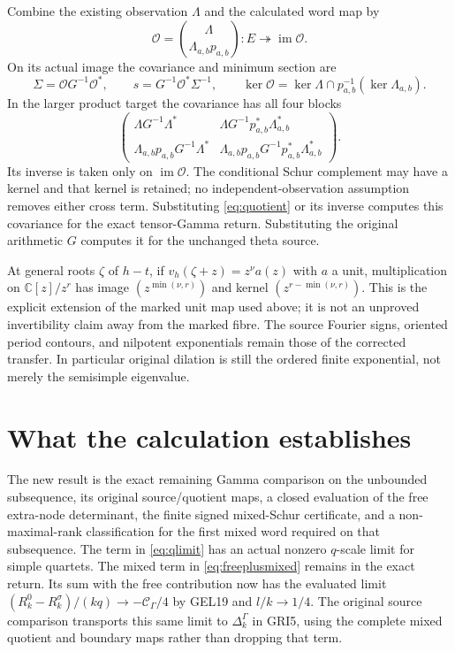\documentclass[11pt,a4paper]{article}
\newcommand{\C}{\mathbb C}
\newcommand{\im}{\operatorname{im}}
\begin{document}
Combine the existing observation $\Lambda$ and the calculated word map by
\begin{equation}
 \mathcal O=\binom{\Lambda}{\Lambda_{a,b}p_{a,b}}:
 E\twoheadrightarrow\im\mathcal O.
\end{equation}
On its actual image the covariance and minimum section are
\begin{equation}
 \Sigma=\mathcal O G^{-1}\mathcal O^*,\qquad
 s=G^{-1}\mathcal O^*\Sigma^{-1},\qquad
 \ker\mathcal O=\ker\Lambda\cap p_{a,b}^{-1}(\ker\Lambda_{a,b}).
\end{equation}
In the larger product target the covariance has all four blocks
\begin{equation}
 \begin{pmatrix}
 \Lambda G^{-1}\Lambda^*&\Lambda G^{-1}p_{a,b}^*\Lambda_{a,b}^*\\
 \Lambda_{a,b}p_{a,b}G^{-1}\Lambda^*&
 \Lambda_{a,b}p_{a,b}G^{-1}p_{a,b}^*\Lambda_{a,b}^*
 \end{pmatrix}.
\end{equation}
Its inverse is taken only on $\im\mathcal O$. The conditional Schur complement may have a kernel and that kernel is retained; no independent-observation assumption removes either cross term. Substituting \eqref{eq:quotient} or its inverse computes this covariance for the exact tensor-Gamma return. Substituting the original arithmetic $G$ computes it for the unchanged theta source.

At general roots $\zeta$ of $h-t$, if $v_h(\zeta+z)=z^\nu a(z)$ with $a$ a unit, multiplication on $\C[z]/z^r$ has image $(z^{\min(\nu,r)})$ and kernel $(z^{r-\min(\nu,r)})$. This is the explicit extension of the marked unit map used above; it is not an unproved invertibility claim away from the marked fibre. The source Fourier signs, oriented period contours, and nilpotent exponentials remain those of the corrected transfer. In particular original dilation is still the ordered finite exponential, not merely the semisimple eigenvalue.

\section{What the calculation establishes}
The new result is the exact remaining Gamma comparison on the unbounded subsequence, its original source/quotient maps, a closed evaluation of the free extra-node determinant, the finite signed mixed-Schur certificate, and a non-maximal-rank classification for the first mixed word required on that subsequence. The term in \eqref{eq:qlimit} has an actual nonzero $q$-scale limit for simple quartets. The mixed term in \eqref{eq:freeplusmixed} remains in the exact
return. Its sum with the free contribution now has the evaluated
limit $(R_k^0-R_k^\sigma)/(kq)\to-\mathcal C_\Gamma/4$ by
GEL19 and $l/k\to1/4$. The original source comparison transports
this same limit to $\Delta_k^\Gamma$ in GRI5, using the complete
mixed quotient and boundary maps rather than dropping that term.
\end{document}
